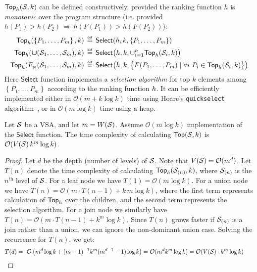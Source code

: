 $\mathsf{Top}_{h}(\mathcal{S}, k)$ can be defined constructively, provided the ranking function $h$ is \emph{monotonic} over the
program structure (i.e. provided $h(P_1) > h(P_2) \,\Rightarrow\, h(F(P_1)) > h(F(P_2))$):
\begin{align*}
    \mathsf{Top}_{h}(\left\{P_1,\dots,P_m\right\}, k) &\,\mathrel{\overset{\mathsf{\scriptscriptstyle def}}{=}}\, \mathsf{Select}(h, k, \left\{P_1,\dots,P_m\right\}) \\
    \mathsf{Top}_{h}(\bm{\mathsf{\cup}}(\mathcal{S}_1,\dots,\mathcal{S}_m), k) &\,\mathrel{\overset{\mathsf{\scriptscriptstyle def}}{=}}\, \mathsf{Select}\bigl(h, k, \cup_{i=1}^n
    \mathsf{Top}_{h}(\mathcal{S}_i, k)\bigr) \\
    \mathsf{Top}_{h}(F_{\text{\scriptsize\ensuremath{\Join}}}(\mathcal{S}_1,\dots,\mathcal{S}_m), k) &\,\mathrel{\overset{\mathsf{\scriptscriptstyle def}}{=}}\,
    \mathsf{Select}\bigl(h, k, \bigl\{F(P_1,\dots, P_m) \mid \forall i\ P_i \in \mathsf{Top}_{h}(\mathcal{S}_i, k)\bigr\} \bigr)
\end{align*}
\noindent Here $\mathsf{Select}$ function implements a \emph{selection algorithm} for top $k$ elements among $\left\{P_1, \dots, P_m\right\}$
according to the ranking function $h$.
It can be efficiently implemented either in $\mathcal{O}(m + k \log k)$ time
using Hoare's \texttt{quickselect} algorithm~\cite{quickselect}, or in $\mathcal{O}(m \log k)$ time using a heap.

\begin{theorem}
    \label{thm:vsa:ranking}
    Let $\mathcal{S}$ be a VSA, and let $m = W(\mathcal{S})$.
    Assume $\mathcal{O}(m \log k)$ implementation of the $\mathsf{Select}$ function.
    The time complexity of calculating $\mathsf{Top}(\mathcal{S}, k)$ is $\mathcal{O}(V(\mathcal{S})\, k^m \log k)$.
\end{theorem}
\begin{proof}
    Let $d$ be the depth (number of levels) of $\mathcal{S}$.
    Note that $V(\mathcal{S}) = \mathcal{O}(m^d)$.
    Let $T(n)$ denote the time complexity of calculating $\mathsf{Top}_{h}(\mathcal{S}_{(n)}, k)$, where $\mathcal{S}_{(n)}$ is the
    $n^{\text{th}}$ level of $\mathcal{S}$.
    For a leaf node we have $T(1) = \mathcal{O}(m \log k)$.
    For a union node we have $T(n) = \mathcal{O}(m \cdot T(n-1) + k\, m \log k)$, where the first term represents calculation of
    $\mathsf{Top}_{h}$ over the children, and the second term represents the selection algorithm.
    For a join node we similarly have $T(n) = \mathcal{O}(m\cdot T(n-1) + k^m \log k)$.
    Since $T(n)$ grows faster if $\mathcal{S}_{(n)}$ is a join rather than a union, we can ignore the non-dominant union case.
    Solving the recurrence for $T(n)$, we get:
    \addtolength{\jot}{-1pt}
    \begin{align*}
        T(d) &=\ \mathcal{O}\left( m^d \log k + (m-1)^{-1} k^m (m^{d-1}-1) \log k \right)
        = \mathcal{O}(m^d k^m \log k) = \mathcal{O}(V(\mathcal{S}) \cdot k^m \log k) \ \ \qedhere
    \end{align*}
\end{proof}

